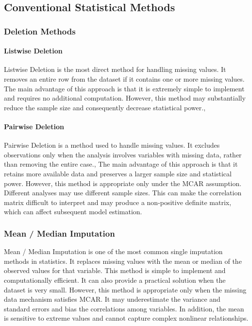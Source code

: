 \documentclass[twocolumn, 9pt]{extarticle}
\begin{document}
\subsection{Conventional Statistical Methods}  
\subsubsection{Deletion Methods}
\paragraph{Listwise Deletion}
Listwise Deletion is the most direct method for handling missing values. It removes an entire row from the dataset if it contains one or more missing values.\cite{popovich2025treat} The main advantage of this approach is that it is extremely simple to implement and requires no additional computation. However, this method may substantially reduce the sample size and consequently decrease statistical power.\cite{little2019statistical},\cite{li2023ultra}
\paragraph{Pairwise Deletion}
Pairwise Deletion is a method used to handle missing values. It excludes observations only when the analysis involves variables with missing data, rather than removing the entire case.\cite{little2019statistical},\cite{li2023ultra} The main advantage of this approach is that it retains more available data and preserves a larger sample size and statistical power. However, this method is appropriate only under the MCAR assumption. Different analyses may use different sample sizes. This can make the correlation matrix difficult to interpret and may produce a non-positive definite matrix, which can affect subsequent model estimation.\cite{zhou2024comprehensive}

\subsubsection{Mean / Median Imputation}
Mean / Median Imputation is one of the most common single imputation methods in statistics. It replaces missing values with the mean or median of the observed values for that variable. This method is simple to implement and computationally efficient. It can also provide a practical solution when the dataset is very small. However, this method is appropriate only when the missing data mechanism satisfies MCAR. It may underestimate the variance and standard errors and bias the correlations among variables. In addition, the mean is sensitive to extreme values and cannot capture complex nonlinear relationships.\cite{zhou2024comprehensive}
\end{document}
